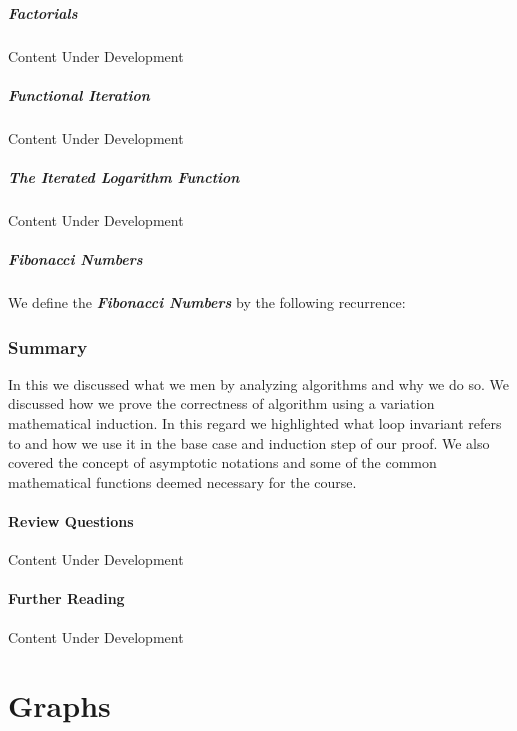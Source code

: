 \documentclass[12pt,a4paper]{book}
\begin{document}
\subsubsection{Factorials}
{\color{red} Content Under Development}
\subsubsection{Functional Iteration}
{\color{red} Content Under Development}
\subsubsection{The Iterated Logarithm Function}
{\color{red} Content Under Development}
\subsubsection{Fibonacci Numbers}
We define the \textbf{\textit{Fibonacci Numbers}} by the following recurrence:
\section{Summary}
In this we discussed what we men by analyzing algorithms and why we do so. We discussed how we prove the correctness of algorithm using a variation mathematical induction. In this regard we highlighted what loop invariant refers to and how we use it in the base case and induction step of our proof. We also covered the concept of asymptotic notations and some of the common mathematical functions deemed necessary for the course.
\subsection{Review Questions}
{\color{red} Content Under Development}
\subsection{Further Reading}
{\color{red} Content Under Development}
\part{Graphs}
\end{document}
